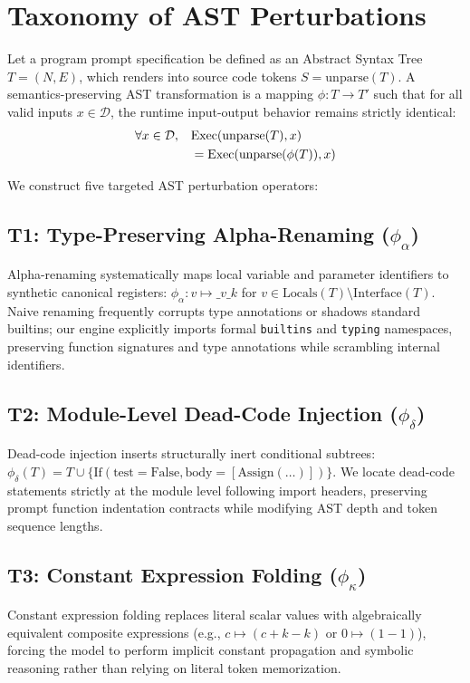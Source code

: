 \documentclass[11pt,twocolumn]{article}
\begin{document}
\section{Taxonomy of AST Perturbations}
\label{sec:taxonomy}

Let a program prompt specification be defined as an Abstract Syntax Tree $T = (N, E)$, which renders into source code tokens $S = \text{unparse}(T)$. A semantics-preserving AST transformation is a mapping $\phi: T \to T'$ such that for all valid inputs $x \in \mathcal{D}$, the runtime input-output behavior remains strictly identical:
\begin{align}
    \forall x \in \mathcal{D}, \quad &\text{Exec}(\text{unparse}(T), x) \notag \\
    &= \text{Exec}(\text{unparse}(\phi(T)), x)
\end{align}

We construct five targeted AST perturbation operators:

\subsection{T1: Type-Preserving Alpha-Renaming (\texorpdfstring{$\phi_\alpha$}{phi-alpha})}
Alpha-renaming systematically maps local variable and parameter identifiers to synthetic canonical registers: $\phi_\alpha: v \mapsto \_v\_k$ for $v \in \text{Locals}(T) \setminus \text{Interface}(T)$. Naive renaming frequently corrupts type annotations or shadows standard builtins; our engine explicitly imports formal \texttt{builtins} and \texttt{typing} namespaces, preserving function signatures and type annotations while scrambling internal identifiers.

\subsection{T2: Module-Level Dead-Code Injection (\texorpdfstring{$\phi_\delta$}{phi-delta})}
Dead-code injection inserts structurally inert conditional subtrees: $\phi_\delta(T) = T \cup \{\text{If}(\text{test}=\text{False}, \text{body}=[\text{Assign}(\dots)])\}$. We locate dead-code statements strictly at the module level following import headers, preserving prompt function indentation contracts while modifying AST depth and token sequence lengths.

\subsection{T3: Constant Expression Folding (\texorpdfstring{$\phi_\kappa$}{phi-kappa})}
Constant expression folding replaces literal scalar values with algebraically equivalent composite expressions (e.g., $c \mapsto (c + k - k)$ or $0 \mapsto (1 - 1)$), forcing the model to perform implicit constant propagation and symbolic reasoning rather than relying on literal token memorization.
\end{document}
